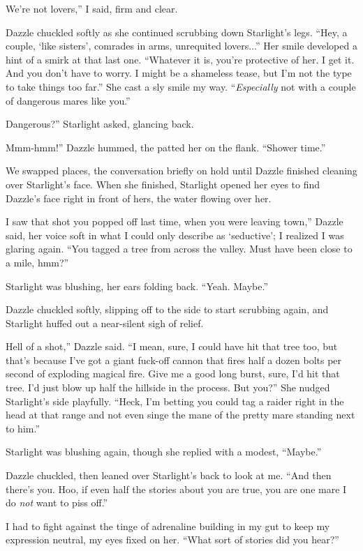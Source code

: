 \leavevmode{}We’re not lovers,” I said, firm and clear.

Dazzle chuckled softly as she continued scrubbing down Starlight’s legs. “Hey, a couple, ‘like sisters’, comrades in arms, unrequited lovers...” Her smile developed a hint of a smirk at that last one. “Whatever it is, you’re protective of her. I get it. And you don’t have to worry. I might be a shameless tease, but I’m not the type to take things too far.” She cast a sly smile my way. “\textit{Especially} not with a couple of dangerous mares like you.”

\leavevmode{}Dangerous?” Starlight asked, glancing back.

\leavevmode{}Mmm-hmm!” Dazzle hummed, the patted her on the flank. “Shower time.”

We swapped places, the conversation briefly on hold until Dazzle finished cleaning over Starlight’s face. When she finished, Starlight opened her eyes to find Dazzle’s face right in front of hers, the water flowing over her.

\leavevmode{}I saw that shot you popped off last time, when you were leaving town,” Dazzle said, her voice soft in what I could only describe as ‘seductive’; I realized I was glaring again. “You tagged a tree from across the valley. Must have been close to a mile, hmm?”

Starlight was blushing, her ears folding back. “Yeah. Maybe.”

Dazzle chuckled softly, slipping off to the side to start scrubbing again, and Starlight huffed out a near-silent sigh of relief.

\leavevmode{}Hell of a shot,” Dazzle said. “I mean, sure, I could have hit that tree too, but that’s because I’ve got a giant fuck-off cannon that fires half a dozen bolts per second of exploding magical fire. Give me a good long burst, sure, I’d hit that tree. I’d just blow up half the hillside in the process. But you?” She nudged Starlight’s side playfully. “Heck, I’m betting you could tag a raider right in the head at that range and not even singe the mane of the pretty mare standing next to him.”

Starlight was blushing again, though she replied with a modest, “Maybe.”

Dazzle chuckled, then leaned over Starlight’s back to look at me. “And then there’s you. Hoo, if even half the stories about you are true, you are one mare I do \textit{not} want to piss off.”

I had to fight against the tinge of adrenaline building in my gut to keep my expression neutral, my eyes fixed on her. “What sort of stories did you hear?”


